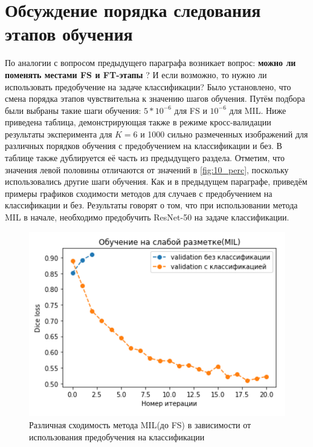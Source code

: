 \section{Обсуждение порядка следования этапов обучения}
По аналогии с вопросом предыдущего параграфа  возникает вопрос:  {\bf можно ли поменять местами FS и FT-этапы} ? И если возможно, то нужно ли использовать предобучение на задаче классификации? Было установлено, что смена порядка этапов чувствительна к значению шагов обучения. Путём подбора были выбраны такие шаги обучения: $5*10^{-6}$ для FS и $10^{-6}$ для MIL. Ниже приведена таблица, демонстрирующая также в режиме кросс-валидации результаты эксперимента для $K = 6$ и 1000 сильно размеченных изображений для различных порядков обучения с предобучением на классификации и без. В таблице также дублируется её часть из предыдущего раздела. Отметим, что значения левой половины отличаются от значений  в \ref{fig:10_perc}, поскольку использовались другие шаги обучения.  Как и в предыдущем параграфе, приведём примеры графиков сходимости методов для случаев с предобучением на классификации и без. Результаты говорят о том, что при использовании метода MIL в начале, необходимо предобучить ResNet-50 на задаче классификации.


\begin{figure}[h!] 
  \center
  \includegraphics [scale=0.7] {images/cmp_order_mil.png}
  \caption{ Различная сходимость метода MIL(до FS) в зависимости от использования предобучения на классификации }
  \label{fig:mil_order}  
\end{figure}

